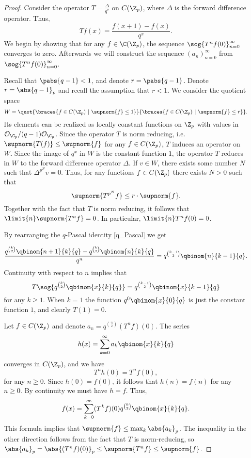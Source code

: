     \begin{proof}
    Consider the operator $T=\frac{\Delta}{q^x}$ on $C(\Z_p)$, where $\Delta$ is the forward difference operator.
    Thus,
    \[Tf(x)=\frac{f(x+1)-f(x)}{q^x}.\]
    We begin by showing that for any $f\in\C(\Z_p)$, the sequence $\sog{T^nf(0)}_{n=0}^\infty$ converges to zero.
    Afterwards we will construct the sequence $(a_n)_{n=0}^\infty$ from $\sog{T^nf(0)}_{n=0}^\infty$.
    
    Recall that $\pabs{q-1}<1$, and denote $r=\pabs{q-1}$.
    Denote $r=\abs{q-1}_p$ and recall the assumption that $r<1$.
    We consider the quotient space
    \[W=\quot{\braces{f\in C(\Z_p)\ |\ \supnorm{f}\leq 1}}{\braces{f\in C(\Z_p)\ |\ \supnorm{f}\leq r}}.\]
    Its elements can be realized as locally constant functions on $\Z_p$ with values in $\mathcal{O}_{\C_p}/(q-1)\mathcal{O}_{\C_p}$.
    Since the operator $T$ is norm reducing, i.e. $\supnorm{T(f)}\leq \supnorm{f}$ for any $f\in C(\Z_p)$, $T$ induces an operator on $W$.
    Since the image of $q^x$ in $W$ is the constant function $1$, the operator $T$ reduces in $W$ to the forward difference operator $\Delta$.
    If $v\in W$, there exists some number $N$ such that $\Delta^{p^N}v= 0$.
    Thus, for any functions $f\in C(\Z_p)$ there exists $N>0$ such that 
    \[\supnorm{T^{p^N}f}\leq r\cdot \supnorm{f}.\]
    Together with the fact that $T$ is norm reducing, it follows that $\limit{n}\supnorm{T^nf}=0$.
    In particular, $\limit{n}T^nf(0)=0$.    
    
    By rearranging the $q$-Pascal identity \ref{q_Pascal} we get
    
    \[\frac{q^{\binom{k}{2}}\qbinom{n+1}{k}{q}-q^{\binom{k}{2}}\qbinom{n}{k}{q}}{q^n}=q^{\binom{k-1}{2}}\qbinom{n}{k-1}{q}.\]
    Continuity with respect to $n$ implies that \[T\sog{q^{\binom{k}{2}}\qbinom{x}{k}{q}}=q^{\binom{k-1}{2}}\qbinom{x}{k-1}{q}\]
    for any $k\geq 1$.
    When $k=1$ the function $q^0\qbinom{x}{0}{q}$ is just the constant function $1$, and clearly $T(1)=0$.
    
    Let $f\in C(\Z_p)$ and denote $a_n=q^{\binom{n}{2}}(T^nf)(0)$.
    The series 
    \[h(x)=\sum_{k=0}^\infty a_k\qbinom{x}{k}{q}\]
     converges in $C(\Z_p)$, and we have
     \[T^nh(0)=T^nf(0),\]
     for any $n\geq 0$.
    Since $h(0)=f(0)$, it follows that $h(n)=f(n)$ for any $n\geq 0$.
    By continuity we must have $h=f$.
    Thus,
    \[f(x)=\sum_{k=0}^\infty (T^kf)(0)q^{\binom{k}{2}}\qbinom{x}{k}{q}.\]
    This formula implies that $\supnorm{f}\leq\max_{k}\abs{a_k}_p$.
    The inequality in the other direction follows from the fact that $T$ is norm-reducing, so $\abs{a_k}_p=\abs{(T^nf)(0)}_p\leq \supnorm{T^nf}\leq \supnorm{f}$.
    \end{proof} 
